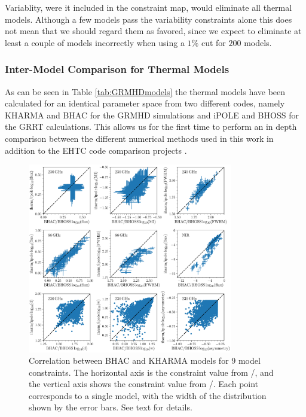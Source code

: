 Variablity, were it included in the constraint map, would eliminate all thermal models.  Although a few models pass the variability constraints alone this does not mean that we should regard them as favored, since we expect to eliminate at least a couple of models incorrectly when using a $1\%$ cut for $200$ models.

\subsubsection{Inter-Model Comparison for Thermal Models}


As can be seen in Table \ref{tab:GRMHDmodels} the thermal models have been calculated for an identical parameter space from two different codes, namely KHARMA and BHAC for the GRMHD simulations and iPOLE and BHOSS for the GRRT calculations. This allows us for the first time to perform an in depth comparison between the different numerical methods used in this work in addition to the EHTC code comparison projects \citep{2019ApJS..243...26P,2020ApJ...897..148G}.

\begin{figure}
  \centering
  \includegraphics[width=0.8\textwidth]{./figures/BHAC_iharm_correlation}
  \caption{Correlation between BHAC and KHARMA models for 9 model constraints.  The horizontal axis is the constraint value from \bhac/\bhoss, and the vertical axis shows the constraint value from \kharma/\ipole.  Each point corresponds to a single model, with the width of the distribution shown by the error bars.  See text for details.}
  \label{fig:modelcorrelation}
\end{figure}

